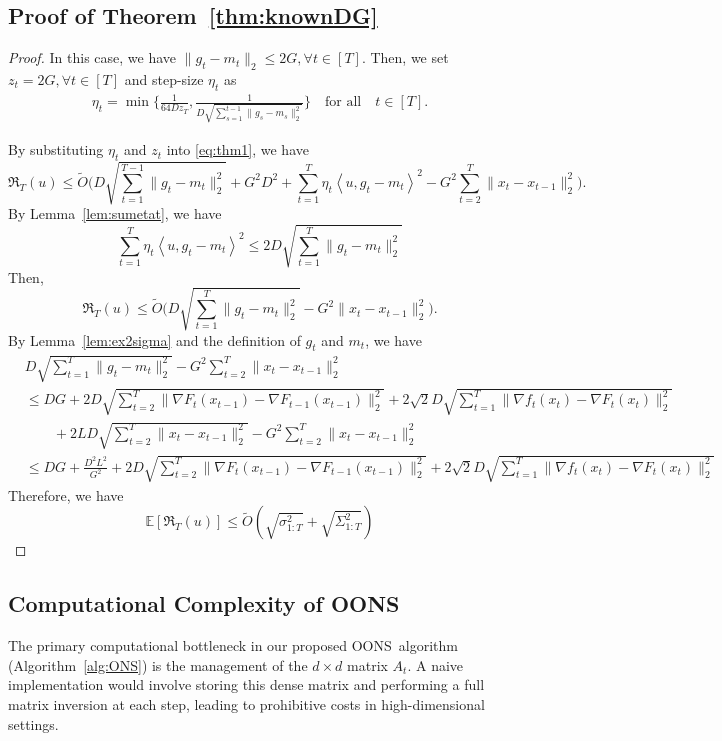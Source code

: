 \documentclass{article}
\theoremstyle{plain}
\theoremstyle{definition}
\theoremstyle{remark}
\newcommand{\oons}{{\sc OONS}}
\newcommand{\regret}{\mathfrak{R}}
\newcommand{\inner}[2]{\left\langle #1, #2 \right\rangle}
\renewcommand{\tilde}{\widetilde}
\begin{document}
\subsection{Proof of Theorem~\ref{thm:knownDG}}
\begin{proof}
In this case, we have $\|g_t-m_t\|_2\leq 2G,\forall t\in[T]$. Then, we set $z_t=2G,\forall t\in[T]$ and step-size $\eta_t$ as
\begin{align*}
\eta_t=\min\Big\{\frac{1}{64Dz_T}, \frac{1}{D\sqrt{\sum_{s=1}^{t-1}\|g_{s}-m_s\|_2^2}}\Big\}\quad \mbox{for all} \quad  t\in[T]. 
\end{align*}

By substituting $\eta_t$ and $z_t$ into \eqref{eq:thm1}, we have
\begin{equation*}
\regret_{T}(u)\leq \tilde{O}\Big(D\sqrt{\sum_{t=1}^{T-1}\|g_{t}-m_t\|_2^2}+G^2D^2+\sum_{t=1}^T \eta_t\inner{u}{g_t-m_t}^2-G^2\sum_{t=2}^T\|x_t-x_{t-1}\|_2^2\Big).
\end{equation*}
By Lemma~\ref{lem:sumetat}, we have 
\begin{equation*}
\sum_{t=1}^T \eta_t\inner{u}{g_t-m_t}^2\leq 2D\sqrt{\sum_{t=1}^{T}\|g_{t}-m_t\|_2^2}
\end{equation*}
Then,
\begin{equation*}
\regret_{T}(u)\leq \tilde{O}\Big(D\sqrt{\sum_{t=1}^{T}\|g_{t}-m_t\|_2^2}-G^2\|x_t-x_{t-1}\|_2^2\Big).
\end{equation*}
By Lemma~\ref{lem:ex2sigma} and the definition of $g_t$ and $m_t$, we have
\begin{align*}
&D\sqrt{\sum_{t=1}^{T}\|g_{t}-m_t\|_2^2}-G^2\sum_{t=2}^T\|x_t-x_{t-1}\|_2^2\\
&\leq DG+2D\sqrt{\sum_{t=2}^T\|\nabla F_t(x_{t-1})-\nabla F_{t-1}(x_{t-1})\|_2^2}+2\sqrt{2}D\sqrt{\sum_{t=1}^T\|\nabla f_t(x_t)-\nabla F_t(x_{t})\|_2^2}\\&\qquad+2LD\sqrt{\sum_{t=2}^T\|x_t-x_{t-1}\|_2^2}-G^2\sum_{t=2}^T\|x_t-x_{t-1}\|_2^2\\
&\leq DG+\frac{D^2L^2}{G^2}+2D\sqrt{\sum_{t=2}^T\|\nabla F_t(x_{t-1})-\nabla F_{t-1}(x_{t-1})\|_2^2}+2\sqrt{2}D\sqrt{\sum_{t=1}^T\|\nabla f_t(x_t)-\nabla F_t(x_{t})\|_2^2}
\end{align*}
Therefore, we have
\begin{equation*}
\mathbb{E}[\regret_T(u)]\leq \tilde{O}(\sqrt{\sigma_{1:T}^2}+\sqrt{\Sigma_{1:T}^2})
\end{equation*}
\end{proof}

\subsection{Computational Complexity of OONS}
The primary computational bottleneck in our proposed \oons\ algorithm (Algorithm~\ref{alg:ONS}) is the management of the $d \times d$ matrix $A_t$. A naive implementation would involve storing this dense matrix and performing a full matrix inversion at each step, leading to prohibitive costs in high-dimensional settings.
\end{document}
